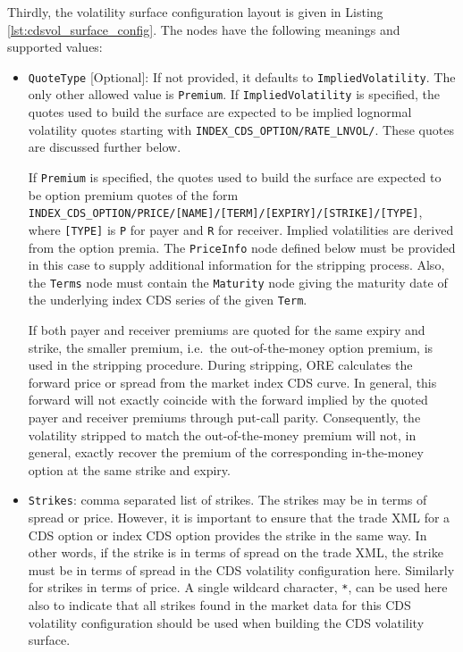 Thirdly, the volatility surface configuration layout is given in Listing \ref{lst:cdsvol_surface_config}. 
The nodes have the following meanings and supported values:
\begin{itemize}

\item
\lstinline!QuoteType! [Optional]: If not provided, it defaults to \lstinline!ImpliedVolatility!.
The only other allowed value is \lstinline!Premium!.
If \lstinline!ImpliedVolatility! is specified, the quotes used to build the surface are expected to be 
implied lognormal volatility quotes starting with \lstinline!INDEX_CDS_OPTION/RATE_LNVOL/!. These quotes are 
discussed further below.

If \lstinline!Premium! is specified, the quotes used to build the surface are expected to be 
option premium quotes of the form \lstinline!INDEX_CDS_OPTION/PRICE/[NAME]/[TERM]/[EXPIRY]/[STRIKE]/[TYPE]!,
where \lstinline![TYPE]! is \lstinline!P! for payer and \lstinline!R! for receiver.
Implied volatilities are derived from the option premia. The \lstinline!PriceInfo! node defined below must be provided 
in this case to supply additional information for the stripping process. Also, the \lstinline!Terms! node must contain 
the \lstinline!Maturity! node giving the maturity date of the underlying index CDS series of the given \lstinline!Term!.

If both payer and receiver premiums are quoted for the same expiry and strike, the smaller premium, i.e.\ the 
out-of-the-money option premium, is used in the stripping procedure.
During stripping, ORE calculates the forward price or spread from the market index CDS curve. In general, this forward 
will not exactly coincide with the forward implied by the quoted payer and receiver premiums through put-call parity.
Consequently, the volatility stripped to match the out-of-the-money premium will not, in general, exactly recover the 
premium of the corresponding in-the-money option at the same strike and expiry.

\item
\lstinline!Strikes!: comma separated list of strikes. The strikes may be in terms of spread or price. However, it is important to ensure that the trade XML for a CDS option or index CDS option provides the strike in the same way. In other words, if the strike is in terms of spread on the trade XML, the strike must be in terms of spread in the CDS volatility configuration here. Similarly for strikes in terms of price. A single wildcard character, \lstinline!*!, can be used here also to indicate that all strikes found in the market data for this CDS volatility configuration should be used when building the CDS volatility surface.


\end{itemize}
